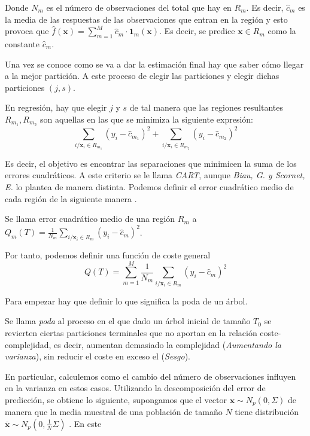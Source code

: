 \noindent Donde $N_m$ es el número de observaciones del total que hay en $R_m$. Es decir, $\hat{c}_m$ es la media de las respuestas de las observaciones que entran en la región y esto provoca que $\hat{f}(\mathbf{x})=\sum_{m=1}^M \hat{c}_m \cdot \mathbf{1}_m(\mathbf{x})$. Es decir, se predice $\mathbf{x}\in R_m$ como la constante $\hat{c}_m$. \cite{Hastie 2001}

\noindent Una vez se conoce como se va a dar la estimación final hay que saber cómo llegar a la mejor partición. A este proceso de elegir las particiones y elegir dichas particiones $(j,s)$. 

\noindent En regresión, hay que elegir $j$ y $s$ de tal manera que las regiones resultantes $R_{m_1},R_{m_2}$ son aquellas en las que se minimiza la siguiente expresión:
\begin{equation}
\sum_{i/\mathbf{x}_i\in R_{m_1} } (y_i-\hat{c}_{m_1})^2+\sum_{i/\mathbf{x}_i\in R_{m_2} } (y_i-\hat{c}_{m_2})^2
\end{equation}

\noindent Es decir, el objetivo es encontrar las separaciones que minimicen la suma de los errores cuadráticos. A este criterio se le llama \emph{CART}, aunque \emph{Biau, G. y Scornet, E.}\cite{Biau 2016} lo plantea de manera distinta. Podemos definir el error cuadrático medio de cada región de la siguiente manera \cite{Hastie 2001}.

\begin{defi}
Se llama error cuadrático medio de una región $R_m$ a $Q_m(T)=\frac{1}{N_m}\sum_{i/\mathbf{x}_i\in R_m}(y_i-\hat{c}_m)^2$.
\end{defi}

\noindent Por tanto, podemos definir una función de coste general 
\begin{equation}
Q(T)=\sum_{m=1}^M\frac{1}{N_m}\sum_{i/\mathbf{x}_i\in R_m} (y_i-\hat{c}_m)^2
\end{equation}

\noindent Para empezar hay que definir lo que significa la poda de un árbol. 
\begin{defi}
Se llama \emph{poda} al proceso en el que dado un árbol inicial de tamaño $T_0$ se revierten ciertas particiones terminales que no aportan en la relación coste-complejidad, es decir, aumentan demasiado la complejidad (\emph{Aumentando la varianza}), sin reducir el coste en exceso el (\emph{Sesgo}).
\end{defi}

\noindent En particular, calculemos como el cambio del número de observaciones influyen en la varianza en estos casos.
Utilizando la descomposición del error de predicción, se obtiene lo siguiente, supongamos que el vector $\mathbf{x}\sim N_p(0, \Sigma)$ de manera que la media muestral de una población de tamaño $N$ tiene distribución $\overline{\mathbf{x}}\sim N_p(0,\frac{1}{N}\Sigma)$ \cite{Mardia 1979 }. En este  

